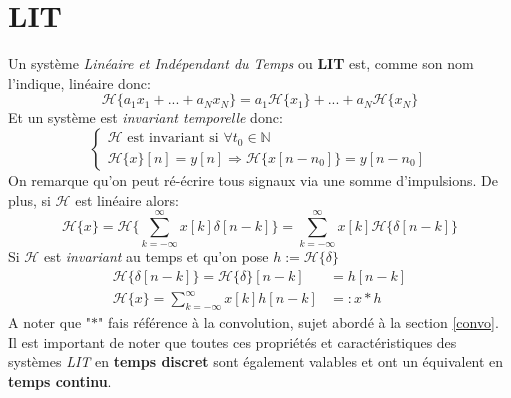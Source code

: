 \documentclass{report}
\begin{document}
\section{LIT}
Un système \textit{Linéaire et Indépendant du Temps} ou \textbf{LIT} est, comme son nom l'indique, linéaire donc:
\begin{equation}
\mathcal{H}\{a_1x_1 + ... + a_Nx_N\} = a_1\mathcal{H}\{x_1\} + ... + a_N\mathcal{H}\{x_N\} 
\end{equation}
Et un système est \textit{invariant temporelle} donc:
\begin{equation}
\begin{cases}
\mathcal{H} \text{ est invariant si } \forall t_0 \in \mathbb{N}\\
\mathcal{H}\{x\}[n] = y[n] \Rightarrow \mathcal{H}\{x[n-n_0]\} = y[n-n_0]
\end{cases}
\end{equation}
On remarque qu'on peut ré-écrire tous signaux via une somme d'impulsions. De plus, si $\mathcal{H}$ est linéaire alors:
\begin{equation}
\mathcal{H}\{x\} = \mathcal{H}\biggl\{\sum_{k= -\infty}^{\infty} x[k]\delta[n-k] \biggl\} = \sum_{k=-\infty}^{\infty} x[k]\mathcal{H}\{\delta[n-k]\}
\end{equation}
Si $\mathcal{H}$ est \textit{invariant} au temps et qu'on pose $h := \mathcal{H}\{\delta\}$
\begin{align}
\mathcal{H}\{\delta[n-k]\} = \mathcal{H}\{\delta\}[n-k] &= h[n-k]\\
\mathcal{H}\{x\} = \sum_{k=-\infty}^{\infty} x[k]h[n-k] &=: x \ast h
\end{align}
A noter que "$\ast$" fais référence à la convolution, sujet abordé à la section \ref{convo}.\\

Il est important de noter que toutes ces propriétés et caractéristiques des systèmes \textit{LIT} en \textbf{temps discret} sont également valables et ont un équivalent en \textbf{temps continu}.
\end{document}
